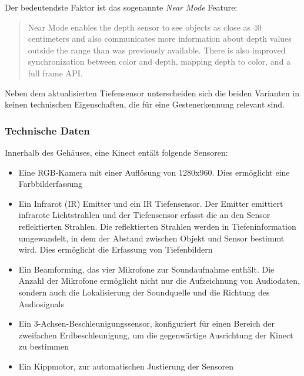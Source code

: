 Der bedeutendste Faktor ist das sogenannte \textit{Near Mode} Feature:
\begin{quote}
Near Mode enables the depth sensor to see objects as close as 40 centimeters and also communicates more information about depth values outside the range than was previously available. There is also improved synchronization between color and depth, mapping depth to color, and a full frame API. \footnotemark[6]
\end{quote}
Neben dem aktualisierten Tiefensensor unterscheiden sich die beiden Varianten in keinen technischen Eigenschaften, die f\"ur eine Gestenerkennung relevant sind.

\subsubsection{Technische Daten}
Innerhalb des Geh\"auses, eine Kinect ent\"alt folgende Sensoren:
\begin{itemize}
  \item Eine RGB-Kamera mit einer Aufl\"osung von 1280x960.
  Dies erm\"oglicht eine Farbbilderfassung
  \item Ein Infrarot (IR) Emitter und ein IR Tiefensensor.
  Der Emitter emittiert infrarote Lichtstrahlen und der Tiefensensor erfasst die an den Sensor reflektierten Strahlen.
  Die reflektierten Strahlen werden in Tiefeninformation umgewandelt, in dem der Abstand zwischen Objekt und Sensor bestimmt wird.
  Dies erm\"oglicht die Erfassung von Tiefenbildern
  \item Ein \gls{Beamforming}, das vier Mikrofone zur Soundaufnahme enth\"alt. Die Anzahl der Mikrofone erm\"oglicht nicht nur die Aufzeichnung von Audiodaten,
  sondern auch die Lokalisierung der Soundquelle und die Richtung des Audiosignals
  \item Ein 3-Achsen-Beschleunigungssensor, konfiguriert f\"ur einen Bereich der zweifachen Erdbeschleunigung, um die gegenw\"artige Ausrichtung der Kinect zu bestimmen
  \item Ein Kippmotor, zur automatischen Justierung der Sensoren
\end{itemize}


